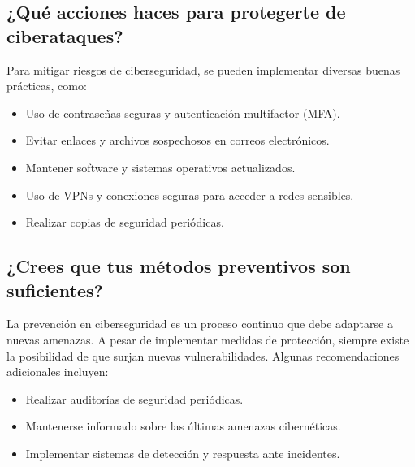 \subsection{¿Qué acciones haces para protegerte de ciberataques?}
Para mitigar riesgos de ciberseguridad, se pueden implementar diversas buenas prácticas, como:
\begin{itemize}
    \item Uso de contraseñas seguras y autenticación multifactor (MFA).
    \item Evitar enlaces y archivos sospechosos en correos electrónicos.
    \item Mantener software y sistemas operativos actualizados.
    \item Uso de VPNs y conexiones seguras para acceder a redes sensibles.
    \item Realizar copias de seguridad periódicas.
\end{itemize}

\subsection{¿Crees que tus métodos preventivos son suficientes?}
La prevención en ciberseguridad es un proceso continuo que debe adaptarse a nuevas amenazas. A pesar de implementar medidas de protección, siempre existe la posibilidad de que surjan nuevas vulnerabilidades. Algunas recomendaciones adicionales incluyen:
\begin{itemize}
    \item Realizar auditorías de seguridad periódicas.
    \item Mantenerse informado sobre las últimas amenazas cibernéticas.
    \item Implementar sistemas de detección y respuesta ante incidentes.
\end{itemize}
